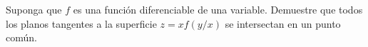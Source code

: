 \item Suponga que $f$ es una función diferenciable de una variable. Demuestre que todos los planos tangentes a la superficie $z = xf(y/x)$ se intersectan en un punto común.
